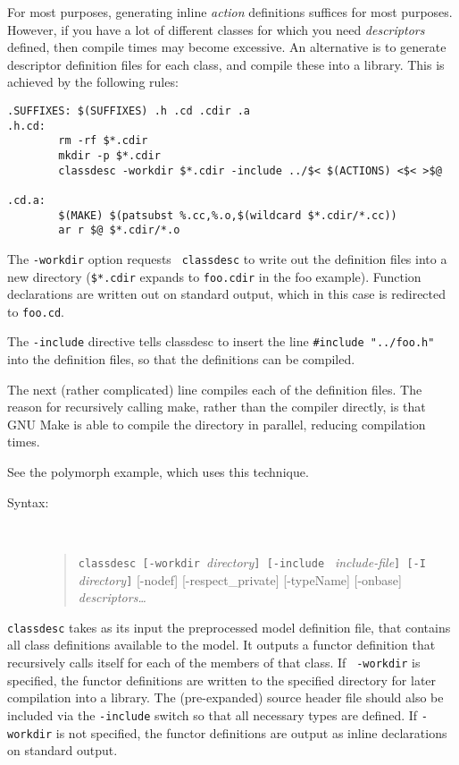 For most purposes, generating inline {\em action} definitions suffices
for most purposes. However, if you have a lot of different classes for
which you need {\em descriptors} defined, then compile times may become
excessive. An alternative is to generate descriptor definition files for each
class, and compile these into a library. This is
achieved by the following rules:

\begin{verbatim}
.SUFFIXES: $(SUFFIXES) .h .cd .cdir .a
.h.cd:
        rm -rf $*.cdir 
        mkdir -p $*.cdir      
        classdesc -workdir $*.cdir -include ../$< $(ACTIONS) <$< >$@

.cd.a:
        $(MAKE) $(patsubst %.cc,%.o,$(wildcard $*.cdir/*.cc))
        ar r $@ $*.cdir/*.o
\end{verbatim}

The {\tt -workdir} option requests {\tt
classdesc} to write out the definition files into a
new directory (\verb+$*.cdir+ %
 expands to {\tt foo.cdir} in the foo
example). Function declarations are written out on standard output,
which in this case is redirected to {\tt foo.cd}.

The {\tt -include} directive tells classdesc to insert
the line \verb+#include "../foo.h"+ into the definition files, so that
the definitions can be compiled.

The next (rather complicated) line compiles each of the definition
files. The reason for recursively calling make, rather than the compiler
directly, is that GNU Make is able to compile the directory in
parallel, reducing compilation times. 

See the polymorph example, which uses this technique.


\begin{description}
\item[Syntax:]\mbox{}\\
\begin{quote}
{\tt classdesc [-workdir }{\em directory}{\tt ] [-include }{\em
  include-file}{\tt ] [-I} {\em directory}{\tt]} [-nodef]
  [-respect\_private] [-typeName] [-onbase] {\em descriptors\ldots}
\end{quote}
\end{description}

{\tt classdesc} takes as its input the preprocessed model definition
file, that contains all class definitions available to the model. It
outputs a functor definition that recursively calls
itself for each of the members of that class. If {\tt
  -workdir} is specified, the functor definitions are
written to the specified directory for later compilation into a
library. The (pre-expanded) source header file should also be included
via the {\tt -include} switch so that all necessary
types are defined. If {\tt -workdir} is not specified, the functor
definitions are output as inline declarations on standard output.

